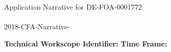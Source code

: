 \documentclass[dvips,11pt]{article}
\begin{document}
\begin{centering} Application Narrative for
  DE-FOA-0001772\\
  \textbf{\large \mytitle}\\
  2018-CFA-Narrative-\ID\\
\end{centering}

\vspace{1em}

\noindent\textbf{Technical Workscope Identifier:} \workscope \hspace{.5in}
\textbf{Time Frame:} \timeframe


















\label{LastPage} 
\end{document}
